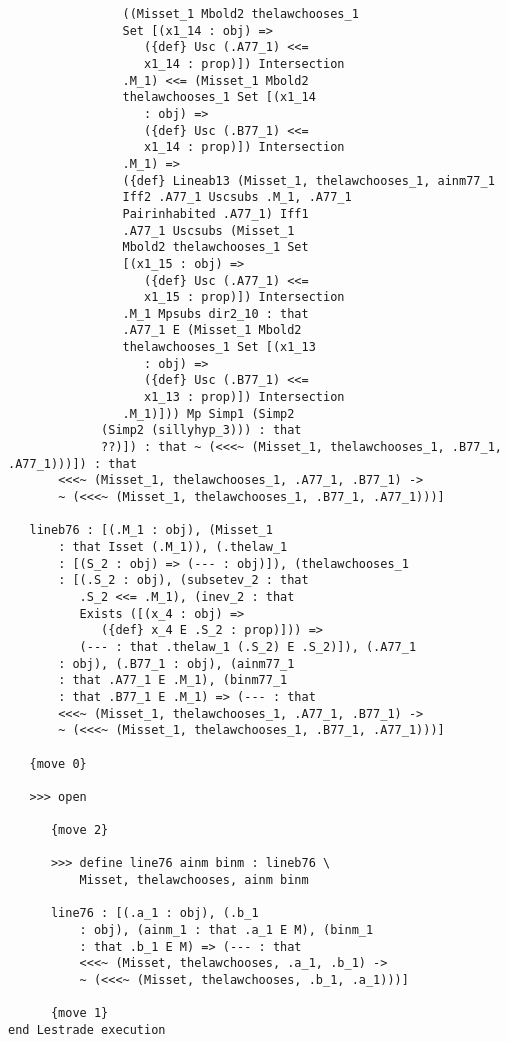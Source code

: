 \documentclass[12pt]{article}
\begin{document}
\begin{verbatim}
                ((Misset_1 Mbold2 thelawchooses_1 
                Set [(x1_14 : obj) => 
                   ({def} Usc (.A77_1) <<= 
                   x1_14 : prop)]) Intersection 
                .M_1) <<= (Misset_1 Mbold2 
                thelawchooses_1 Set [(x1_14 
                   : obj) => 
                   ({def} Usc (.B77_1) <<= 
                   x1_14 : prop)]) Intersection 
                .M_1) => 
                ({def} Lineab13 (Misset_1, thelawchooses_1, ainm77_1 
                Iff2 .A77_1 Uscsubs .M_1, .A77_1 
                Pairinhabited .A77_1) Iff1 
                .A77_1 Uscsubs (Misset_1 
                Mbold2 thelawchooses_1 Set 
                [(x1_15 : obj) => 
                   ({def} Usc (.A77_1) <<= 
                   x1_15 : prop)]) Intersection 
                .M_1 Mpsubs dir2_10 : that 
                .A77_1 E (Misset_1 Mbold2 
                thelawchooses_1 Set [(x1_13 
                   : obj) => 
                   ({def} Usc (.B77_1) <<= 
                   x1_13 : prop)]) Intersection 
                .M_1)])) Mp Simp1 (Simp2 
             (Simp2 (sillyhyp_3))) : that 
             ??)]) : that ~ (<<<~ (Misset_1, thelawchooses_1, .B77_1, .A77_1)))]) : that 
       <<<~ (Misset_1, thelawchooses_1, .A77_1, .B77_1) -> 
       ~ (<<<~ (Misset_1, thelawchooses_1, .B77_1, .A77_1)))]

   lineb76 : [(.M_1 : obj), (Misset_1 
       : that Isset (.M_1)), (.thelaw_1 
       : [(S_2 : obj) => (--- : obj)]), (thelawchooses_1 
       : [(.S_2 : obj), (subsetev_2 : that 
          .S_2 <<= .M_1), (inev_2 : that 
          Exists ([(x_4 : obj) => 
             ({def} x_4 E .S_2 : prop)])) => 
          (--- : that .thelaw_1 (.S_2) E .S_2)]), (.A77_1 
       : obj), (.B77_1 : obj), (ainm77_1 
       : that .A77_1 E .M_1), (binm77_1 
       : that .B77_1 E .M_1) => (--- : that 
       <<<~ (Misset_1, thelawchooses_1, .A77_1, .B77_1) -> 
       ~ (<<<~ (Misset_1, thelawchooses_1, .B77_1, .A77_1)))]

   {move 0}

   >>> open

      {move 2}

      >>> define line76 ainm binm : lineb76 \
          Misset, thelawchooses, ainm binm

      line76 : [(.a_1 : obj), (.b_1 
          : obj), (ainm_1 : that .a_1 E M), (binm_1 
          : that .b_1 E M) => (--- : that 
          <<<~ (Misset, thelawchooses, .a_1, .b_1) -> 
          ~ (<<<~ (Misset, thelawchooses, .b_1, .a_1)))]

      {move 1}
end Lestrade execution
\end{verbatim}
\end{document}
